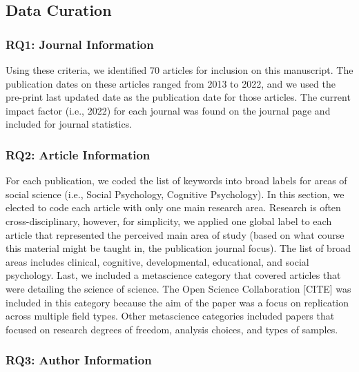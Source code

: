 \documentclass[
  english,
  man]{apa6}
\begin{document}
\hypertarget{data-curation}{%
\subsection{Data Curation}\label{data-curation}}

\hypertarget{rq1-journal-information}{%
\subsubsection{RQ1: Journal Information}\label{rq1-journal-information}}

Using these criteria, we identified 70 articles for inclusion on this manuscript. The publication dates on these articles ranged from 2013 to 2022, and we used the pre-print last updated date as the publication date for those articles. The current impact factor (i.e., 2022) for each journal was found on the journal page and included for journal statistics.

\hypertarget{rq2-article-information}{%
\subsubsection{RQ2: Article Information}\label{rq2-article-information}}

For each publication, we coded the list of keywords into broad labels for areas of social science (i.e., Social Psychology, Cognitive Psychology). In this section, we elected to code each article with only one main research area. Research is often cross-disciplinary, however, for simplicity, we applied one global label to each article that represented the perceived main area of study (based on what course this material might be taught in, the publication journal focus). The list of broad areas includes clinical, cognitive, developmental, educational, and social psychology. Last, we included a metascience category that covered articles that were detailing the science of science. The Open Science Collaboration {[}CITE{]} was included in this category because the aim of the paper was a focus on replication across multiple field types. Other metascience categories included papers that focused on research degrees of freedom, analysis choices, and types of samples.

\hypertarget{rq3-author-information}{%
\subsubsection{RQ3: Author Information}\label{rq3-author-information}}
\end{document}
